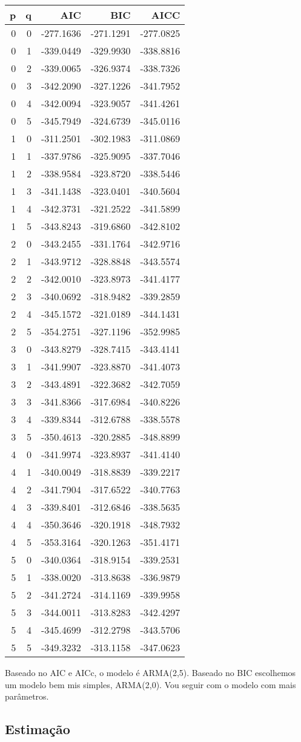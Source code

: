 \documentclass[]{article}
\begin{document}
\begin{longtable}[]{@{}rrrrr@{}}
\toprule
p & q & AIC & BIC & AICC\tabularnewline
\midrule
\endhead
0 & 0 & -277.1636 & -271.1291 & -277.0825\tabularnewline
0 & 1 & -339.0449 & -329.9930 & -338.8816\tabularnewline
0 & 2 & -339.0065 & -326.9374 & -338.7326\tabularnewline
0 & 3 & -342.2090 & -327.1226 & -341.7952\tabularnewline
0 & 4 & -342.0094 & -323.9057 & -341.4261\tabularnewline
0 & 5 & -345.7949 & -324.6739 & -345.0116\tabularnewline
1 & 0 & -311.2501 & -302.1983 & -311.0869\tabularnewline
1 & 1 & -337.9786 & -325.9095 & -337.7046\tabularnewline
1 & 2 & -338.9584 & -323.8720 & -338.5446\tabularnewline
1 & 3 & -341.1438 & -323.0401 & -340.5604\tabularnewline
1 & 4 & -342.3731 & -321.2522 & -341.5899\tabularnewline
1 & 5 & -343.8243 & -319.6860 & -342.8102\tabularnewline
2 & 0 & -343.2455 & -331.1764 & -342.9716\tabularnewline
2 & 1 & -343.9712 & -328.8848 & -343.5574\tabularnewline
2 & 2 & -342.0010 & -323.8973 & -341.4177\tabularnewline
2 & 3 & -340.0692 & -318.9482 & -339.2859\tabularnewline
2 & 4 & -345.1572 & -321.0189 & -344.1431\tabularnewline
2 & 5 & -354.2751 & -327.1196 & -352.9985\tabularnewline
3 & 0 & -343.8279 & -328.7415 & -343.4141\tabularnewline
3 & 1 & -341.9907 & -323.8870 & -341.4073\tabularnewline
3 & 2 & -343.4891 & -322.3682 & -342.7059\tabularnewline
3 & 3 & -341.8366 & -317.6984 & -340.8226\tabularnewline
3 & 4 & -339.8344 & -312.6788 & -338.5578\tabularnewline
3 & 5 & -350.4613 & -320.2885 & -348.8899\tabularnewline
4 & 0 & -341.9974 & -323.8937 & -341.4140\tabularnewline
4 & 1 & -340.0049 & -318.8839 & -339.2217\tabularnewline
4 & 2 & -341.7904 & -317.6522 & -340.7763\tabularnewline
4 & 3 & -339.8401 & -312.6846 & -338.5635\tabularnewline
4 & 4 & -350.3646 & -320.1918 & -348.7932\tabularnewline
4 & 5 & -353.3164 & -320.1263 & -351.4171\tabularnewline
5 & 0 & -340.0364 & -318.9154 & -339.2531\tabularnewline
5 & 1 & -338.0020 & -313.8638 & -336.9879\tabularnewline
5 & 2 & -341.2724 & -314.1169 & -339.9958\tabularnewline
5 & 3 & -344.0011 & -313.8283 & -342.4297\tabularnewline
5 & 4 & -345.4699 & -312.2798 & -343.5706\tabularnewline
5 & 5 & -349.3232 & -313.1158 & -347.0623\tabularnewline
\bottomrule
\end{longtable}

Baseado no AIC e AICc, o modelo é ARMA(2,5). Baseado no BIC escolhemos
um modelo bem mis simples, ARMA(2,0). Vou seguir com o modelo com mais
parâmetros.

\hypertarget{estimauxe7uxe3o-1}{%
\subsection{Estimação}\label{estimauxe7uxe3o-1}}
\end{document}
